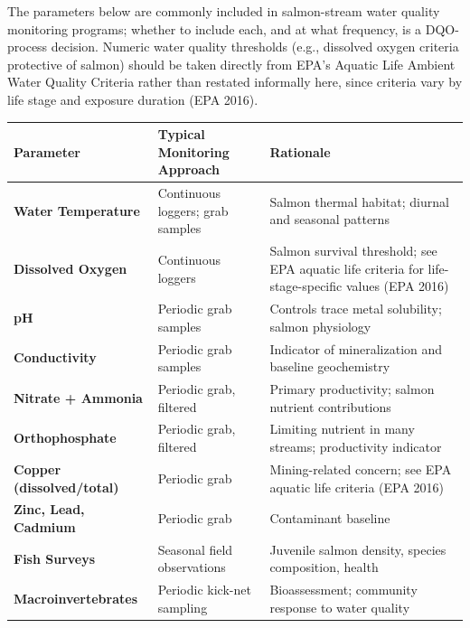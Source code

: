 \documentclass[
  letterpaper,
]{scrbook}
\begin{document}
The parameters below are commonly included in salmon-stream water
quality monitoring programs; whether to include each, and at what
frequency, is a DQO-process decision. Numeric water quality thresholds
(e.g., dissolved oxygen criteria protective of salmon) should be taken
directly from EPA's Aquatic Life Ambient Water Quality Criteria rather
than restated informally here, since criteria vary by life stage and
exposure duration (EPA 2016).

\begin{longtable}[]{@{}
  >{\raggedright\arraybackslash}p{}
  >{\raggedright\arraybackslash}p{}
  >{\raggedright\arraybackslash}p{}@{}}
\toprule\noalign{}
\begin{minipage}[b]{\linewidth}\raggedright
Parameter
\end{minipage} & \begin{minipage}[b]{\linewidth}\raggedright
Typical Monitoring Approach
\end{minipage} & \begin{minipage}[b]{\linewidth}\raggedright
Rationale
\end{minipage} \\
\midrule\noalign{}
\endhead
\bottomrule\noalign{}
\endlastfoot
\textbf{Water Temperature} & Continuous loggers; grab samples & Salmon
thermal habitat; diurnal and seasonal patterns \\
\textbf{Dissolved Oxygen} & Continuous loggers & Salmon survival
threshold; see EPA aquatic life criteria for life-stage-specific values
(EPA 2016) \\
\textbf{pH} & Periodic grab samples & Controls trace metal solubility;
salmon physiology \\
\textbf{Conductivity} & Periodic grab samples & Indicator of
mineralization and baseline geochemistry \\
\textbf{Nitrate + Ammonia} & Periodic grab, filtered & Primary
productivity; salmon nutrient contributions \\
\textbf{Orthophosphate} & Periodic grab, filtered & Limiting nutrient in
many streams; productivity indicator \\
\textbf{Copper (dissolved/total)} & Periodic grab & Mining-related
concern; see EPA aquatic life criteria (EPA 2016) \\
\textbf{Zinc, Lead, Cadmium} & Periodic grab & Contaminant baseline \\
\textbf{Fish Surveys} & Seasonal field observations & Juvenile salmon
density, species composition, health \\
\textbf{Macroinvertebrates} & Periodic kick-net sampling &
Bioassessment; community response to water quality \\
\end{longtable}
\end{document}
